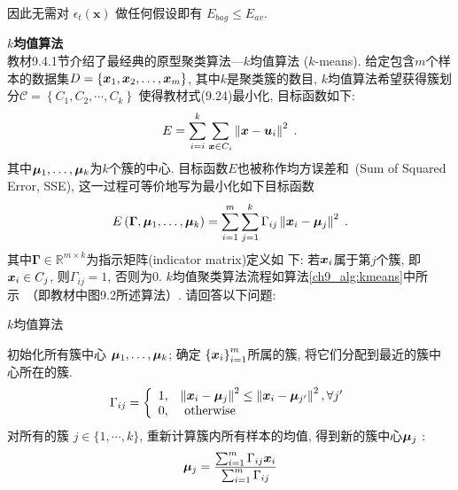 \documentclass[answers]{exam}  %
\begin{document}
\begin{questions}
\begin{solution}
\begin{enumerate}
            因此无需对 $\epsilon_{t}(\bm{x})$ 做任何假设即有 $E_{bag} \le E_{av}$.
    \end{enumerate}
  \end{solution}

  \question [20] \textbf{$k$均值算法} \\
  \label{ch9_prob:kmeans}
  教材9.4.1节介绍了最经典的原型聚类算法---$k$均值算法 ($k$-means). 给定包含$m$个样本的数据集$D =\left\{{\boldsymbol{x}}_{1}, {\boldsymbol{x}}_{2}, \ldots, {\boldsymbol{x}}_{m}\right\}$, 其中$k$是聚类簇的数目, $k$均值算法希望获得簇划分$\mathcal{C}=\left\{C_{1}, C_{2}, \cdots, C_{k}\right\}$
  使得教材式(9.24)最小化, 目标函数如下:
  \begin{equation}
    E=\sum_{i=i}^{k}\sum_{{\boldsymbol{x}} \in C_{i}}\left\| {\boldsymbol{x}}-\boldsymbol{u}_{i} \right\|^{2}\;.
  \end{equation}
  其中$\boldsymbol{\mu}_{1}, \ldots, \boldsymbol{\mu}_{k}$为$k$个簇的中心. 目标函数$E$也被称作均方误差和~(Sum of Squared Error, SSE),
  这一过程可等价地写为最小化如下目标函数
  \begin{equation} \label{ch9_kmeans_obj}
    E\left(\mathbf{\Gamma}, \boldsymbol{\mu}_{1}, \ldots, \boldsymbol{\mu}_{k}\right)=\sum_{i=1}^{m} \sum_{j=1}^{k} {\Gamma}_{i j}\left\|{\boldsymbol{x}}_{i}-\boldsymbol{\mu}_{j}\right\|^{2}\;.
  \end{equation}
  其中$\mathbf{\Gamma} \in \mathbb{R}^{m \times k}$为指示矩阵(indicator matrix)定义如
  下: 若${\boldsymbol{x}}_{i}$属于第$j$个簇, 即${\boldsymbol{x}}_i\in C_j$, 则${\Gamma}_{i j}=1$, 否则为0.
  $k$均值聚类算法流程如算法\ref{ch9_alg:kmeans}中所示~（即教材中图9.2所述算法）. 请回答以下问题:
  {\begin{algorithm}[ht]
    \caption{ $k$均值算法 }
    \label{ch9_alg:kmeans}
    \begin{algorithmic}[1]{
        \State 初始化所有簇中心 $\boldsymbol{\mu}_{1}, \ldots, \boldsymbol{\mu}_{k}$;
        \Repeat
         确定 $\left\{{\boldsymbol{x}}_{i}\right\}_{i=1}^{m}$所属的簇, 将它们分配到最近的簇中心所在的簇.
        \begin{align}{\Gamma}_{i j}=\left\{\begin{array}{ll}
            1, & \left\|{\boldsymbol{x}}_{i}-\boldsymbol{\mu}_{j}\right\|^{2} \leq \left\|{\boldsymbol{x}}_{i}-\boldsymbol{\mu}_{j^{\prime}}\right\|^{2}, \forall j^{\prime} \\
            0, & \text { otherwise }
          \end{array}\right.\end{align} \label{ch9_:step1}
         对所有的簇 $j \in\{1, \cdots, k\}$, 重新计算簇内所有样本的均值, 得到新的簇中心$\boldsymbol{\mu}_j$  :
        \begin{align}\boldsymbol{\mu}_{j}=\frac{\sum_{i=1}^{m} {\Gamma}_{i j} {\boldsymbol{x}}_{i}}{\sum_{i=1}^{m} {\Gamma}_{i j}}\end{align}

}
\end{algorithmic}
\end{algorithm}}
\end{questions}
\end{document}
